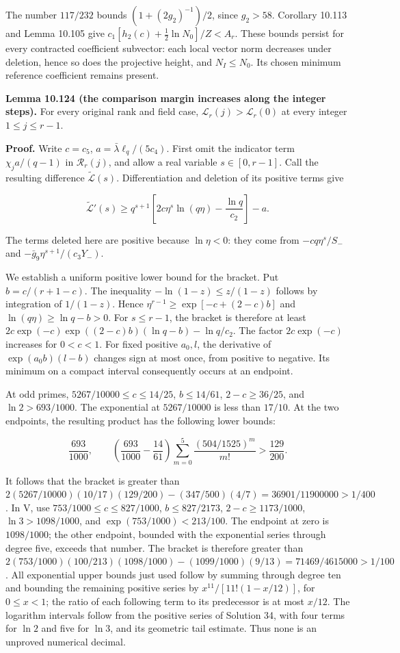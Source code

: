 \documentclass[
  11pt,
  a4paper,
]{article}
\newcounter{none} %
\begin{document}
The number \(117/232\) bounds \((1+(2g_2)^{-1})/2\), since \(g_2>58\).
Corollary 10.113 and Lemma 10.105 give
\(c_1[h_2(c)+\tfrac12\ln N_0]/Z<A_r\). These bounds persist for every
contracted coefficient subvector: each local vector norm decreases under
deletion, hence so does the projective height, and \(N_I\le N_0\). Its
chosen minimum reference coefficient remains present.

\textbf{Lemma 10.124 (the comparison margin increases along the integer
steps).} For every original rank and field case,
\(\mathcal L_r(j)>\mathcal L_r(0)\) at every integer \(1\le j\le r-1\).

\textbf{Proof.} Write \(c=c_5\), \(a=\bar\lambda\ell_q/(5c_4)\). First
omit the indicator term \(\chi_ja/(q-1)\) in \(\mathcal R_r(j)\), and
allow a real variable \(s\in[0,r-1]\). Call the resulting difference
\(\widetilde{\mathcal L}(s)\). Differentiation and deletion of its
positive terms give

\[
\widetilde{\mathcal L}'(s)
\ge q^{s+1}\left[2c\eta^s\ln(q\eta)-\frac{\ln q}{c_2}\right]-a.
\tag{10.333}
\]

The terms deleted here are positive because \(\ln\eta<0\): they come
from \(-cq\eta^s/S_-\) and \(-\bar g_9\eta^{s+1}/(c_3Y_-)\).

We establish a uniform positive lower bound for the bracket. Put
\(b=c/(r+1-c)\). The inequality \(-\ln(1-z)\le z/(1-z)\) follows by
integration of \(1/(1-z)\). Hence \(\eta^{r-1}\ge\exp[-c+(2-c)b]\) and
\(\ln(q\eta)\ge\ln q-b>0\). For \(s\le r-1\), the bracket is therefore
at least \(2c\exp(-c)\exp((2-c)b)(\ln q-b)-\ln q/c_2\). The factor
\(2c\exp(-c)\) increases for \(0<c<1\). For fixed positive \(a_0,l\),
the derivative of \(\exp(a_0b)(l-b)\) changes sign at most once, from
positive to negative. Its minimum on a compact interval consequently
occurs at an endpoint.

At odd primes, \(5267/10000\le c\le14/25\), \(b\le14/61\),
\(2-c\ge36/25\), and \(\ln2>693/1000\). The exponential at
\(5267/10000\) is less than \(17/10\). At the two endpoints, the
resulting product has the following lower bounds:

\[
\frac{693}{1000},\qquad
\left(\frac{693}{1000}-\frac{14}{61}\right)
\sum_{m=0}^{5}\frac{(504/1525)^m}{m!}
>\frac{129}{200}.
\]

It follows that the bracket is greater than
\(2(5267/10000)(10/17)(129/200)-(347/500)(4/7)
=36901/11900000>1/400\). In V, use \(753/1000\le c\le827/1000\),
\(b\le827/2173\), \(2-c\ge1173/1000\), \(\ln3>1098/1000\), and
\(\exp(753/1000)<213/100\). The endpoint at zero is \(1098/1000\); the
other endpoint, bounded with the exponential series through degree five,
exceeds that number. The bracket is therefore greater than
\(2(753/1000)(100/213)(1098/1000)-(1099/1000)(9/13)
=71469/4615000>1/100\). All exponential upper bounds just used follow by
summing through degree ten and bounding the remaining positive series by
\(x^{11}/[11!(1-x/12)]\), for \(0\le x<1\); the ratio of each following
term to its predecessor is at most \(x/12\). The logarithm intervals
follow from the positive series of Solution 34, with four terms for
\(\ln2\) and five for \(\ln3\), and its geometric tail estimate. Thus
none is an unproved numerical decimal.
\end{document}
